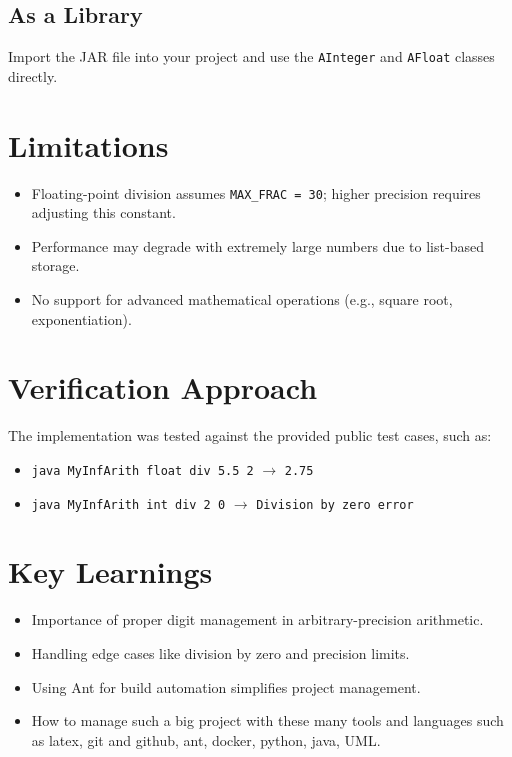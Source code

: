 \documentclass[12pt]{article}
\begin{document}
\subsection{As a Library}
Import the JAR file into your project and use the \texttt{AInteger} and \texttt{AFloat} classes directly.

\section{Limitations}
\begin{itemize}
    \item Floating-point division assumes \texttt{MAX\_FRAC = 30}; higher precision requires adjusting this constant.
    \item Performance may degrade with extremely large numbers due to list-based storage.
    \item No support for advanced mathematical operations (e.g., square root, exponentiation).
\end{itemize}

\section{Verification Approach}
The implementation was tested against the provided public test cases, such as:
\begin{itemize}
    \item \texttt{java MyInfArith float div 5.5 2} $\rightarrow$ \texttt{2.75}
    \item \texttt{java MyInfArith int div 2 0} $\rightarrow$ \texttt{Division by zero error}
\end{itemize}

\section{Key Learnings}
\begin{itemize}
    \item Importance of proper digit management in arbitrary-precision arithmetic.
    \item Handling edge cases like division by zero and precision limits.
    \item Using Ant for build automation simplifies project management.
    \item How to manage such a big project with these many tools and languages such as latex, git and github, ant, docker, python, java, UML.
\end{itemize}
\end{document}
